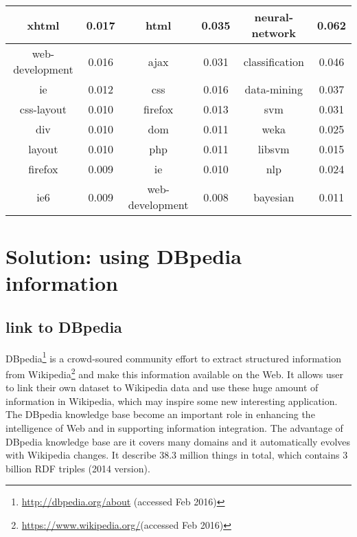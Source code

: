 \begin{table}[htp]
\begin{tabular}{|c|c|c|c|c|c|}
\hline
xhtml&0.017&html&0.035&neural-network&0.062\\
\hline
web-development&0.016&ajax&0.031&classification&0.046\\
\hline
ie&0.012&css&0.016&data-mining&0.037\\
\hline
css-layout&0.010&firefox&0.013&svm&0.031\\
\hline
div&0.010&dom&0.011&weka&0.025\\
\hline
layout&0.010&php&0.011&libsvm&0.015\\
\hline
firefox&0.009&ie&0.010&nlp&0.024\\
\hline
ie6&0.009&web-development&0.008&bayesian&0.011\\
\hline
\end{tabular}
\end{table}

\section{Solution: using DBpedia information}
\label{sec:chp6secSolution}

\subsection{link to DBpedia}

DBpedia\footnote{\url{http://dbpedia.org/about} (accessed Feb 2016)} is a crowd-soured community effort to extract structured information from Wikipedia\footnote{\url{https://www.wikipedia.org/}(accessed Feb 2016)} and make this information available on the Web. It allows user to link their own dataset to Wikipedia data and use these huge amount of information in Wikipedia, which may inspire some new interesting application. The DBpedia knowledge base become an important role in enhancing the intelligence of Web and in supporting information integration. The advantage of DBpedia knowledge base are it covers many domains and it automatically evolves with Wikipedia changes. It describe 38.3 million things in total, which contains 3 billion RDF triples (2014 version).


